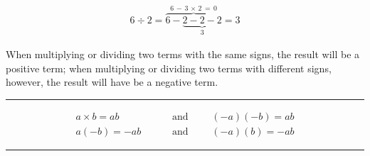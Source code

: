 \documentclass[a5paper,9pt]{book}
\theoremstyle{definition}
\newcommand{\txtlinesur}[1]{%
    \vspace*{\baselineskip}

    \hrule%

    \vspace*{\medskipamount}

    #1

    \vspace*{\medskipamount}

    \hrule%

    \vspace*{\baselineskip}
}
\newcommand{\xx}{\!\times\!}
\begin{document}
                \begin{align*}
                    6 \div 2 = \overset{6\,-\,3\,\xx\,2\,=\,0}{\overbrace{6 - \underset{3}{\underbrace{2 - 2 - 2}}}} = 3
                \end{align*}

                When multiplying or dividing two terms with the same signs, the result
                will be a positive term; when multiplying or dividing two terms with
                different signs, however, the result will have be a negative term.

                \txtlinesur{\begin{align*}
                        a\times b = ab \qquad&\text{ and }\qquad (-a)(-b) = ab\\
                        a(-b) = -ab \qquad&\text{ and }\qquad (-a)(b) = - ab
                \end{align*}}

                \pagebreak

\end{document}
